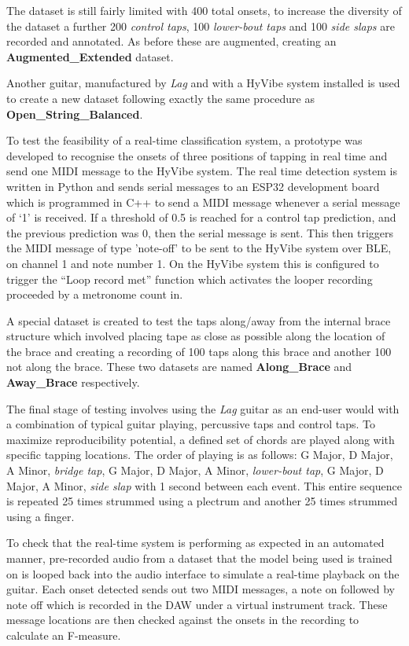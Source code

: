 \documentclass[conference]{IEEEtran}
\begin{document}
The dataset is still fairly limited with 400 total onsets, to increase the diversity of the dataset a further 200 \emph{control taps}, 100 \emph{lower-bout taps} and 100 \emph{side slaps} are recorded and annotated. As before these are augmented, creating an \textbf{Augmented\_Extended} dataset. 

Another guitar, manufactured by \emph{Lag} and with a HyVibe system installed is used to create a new dataset following exactly the same procedure as \textbf{Open\_String\_Balanced}.

To test the feasibility of a real-time classification system, a prototype was developed to recognise the onsets of three positions of tapping in real time and send one MIDI message to the HyVibe system.
The real time detection system is written in Python and sends serial messages to an ESP32 development board which is programmed in C++ to send a MIDI message whenever a serial
message of `1' is received. If a threshold of 0.5 is reached for a control tap prediction, and the previous prediction was 0, then the serial message is sent.
This then triggers the MIDI message of type 'note-off' to be sent to the HyVibe system over BLE, on channel 1 and note number 1. On the HyVibe system this is configured to trigger the ``Loop record met'' function
which activates the looper recording proceeded by a metronome count in.

A special dataset is created to test the taps along/away from the internal brace structure which involved placing tape as close as possible along the location of the brace and creating a recording of 100 taps along this brace and another 100 not along the 
brace. These two datasets are named \textbf{Along\_Brace} and \textbf{Away\_Brace} respectively. 

The final stage of testing involves using the \emph{Lag} guitar as an end-user would with a combination of typical guitar playing, percussive taps and control taps. 
To maximize reproducibility potential, a defined set of chords are played along with specific tapping locations. The order of playing is as follows: G Major, D Major, A Minor, \emph{bridge tap}, G Major, D Major, A Minor, \emph{lower-bout tap}, G Major, D Major, A Minor, \emph{side slap} with 1 second between each event.
This entire sequence is repeated 25 times strummed using a plectrum and another 25 times strummed using a finger.

To check that the real-time system is performing as expected in an automated manner, pre-recorded audio from a dataset that the model being used is trained on is looped back into the audio interface to simulate a real-time playback on the guitar. Each onset detected sends out two MIDI messages, a note on
followed by note off which is recorded in the DAW under a virtual instrument track. These message locations are then checked against the onsets in the recording to calculate an F-measure.
\end{document}
